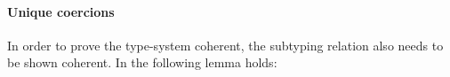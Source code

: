 
\paragraph{Unique coercions}

%
%
%
%
%

In order to prove the type-system coherent, the subtyping relation also 
needs to be shown coherent. In \name the following lemma holds:

